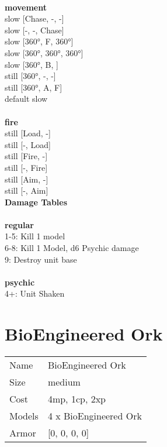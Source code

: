 \ \\ {\bf movement } \\
slow [Chase, -, -] \\
slow [-, -, Chase] \\
slow [360°, F, 360°] \\
slow [360°, 360°, 360°] \\
slow [360°, B, ] \\
still [360°, -, -] \\
still [360°, A, F] \\
default slow \\
\ \\ {\bf fire } \\
still [Load, -] \\
still [-, Load] \\
still [Fire, -] \\
still [-, Fire] \\
still [Aim, -] \\
still [-, Aim] \\


{\bf Damage Tables} \\
\ \\ {\bf regular } \\
1-5: Kill 1 model \\
6-8: Kill 1 Model, d6 Psychic damage \\
9: Destroy unit base \\
\ \\ {\bf psychic } \\
4+: Unit Shaken \\










\pagebreak\pagebreak

\section{ BioEngineered Ork }

\begin{tabular}{ll}
  Name & BioEngineered Ork \\
  Size & medium\\
  Cost & 4mp, 1cp, 2xp\\
  Models & 4 x BioEngineered Ork\\
  Armor & [0, 0, 0, 0]\\
\end{tabular}


